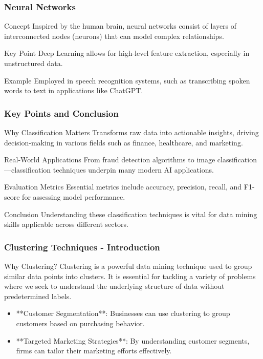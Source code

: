\documentclass[aspectratio=169]{beamer}
\begin{document}
\begin{frame}[fragile]
    \frametitle{Neural Networks}
    \begin{block}{Concept}
        Inspired by the human brain, neural networks consist of layers of interconnected nodes (neurons) that can model complex relationships.
    \end{block}
    \begin{block}{Key Point}
        Deep Learning allows for high-level feature extraction, especially in unstructured data.
    \end{block}
    \begin{block}{Example}
        Employed in speech recognition systems, such as transcribing spoken words to text in applications like ChatGPT.
    \end{block}
\end{frame}

\begin{frame}[fragile]
    \frametitle{Key Points and Conclusion}
    \begin{block}{Why Classification Matters}
        Transforms raw data into actionable insights, driving decision-making in various fields such as finance, healthcare, and marketing.
    \end{block}
    \begin{block}{Real-World Applications}
        From fraud detection algorithms to image classification—classification techniques underpin many modern AI applications.
    \end{block}
    \begin{block}{Evaluation Metrics}
        Essential metrics include accuracy, precision, recall, and F1-score for assessing model performance.
    \end{block}
    \begin{block}{Conclusion}
        Understanding these classification techniques is vital for data mining skills applicable across different sectors.
    \end{block}
\end{frame}

\begin{frame}[fragile]
    \frametitle{Clustering Techniques - Introduction}
    \begin{block}{Why Clustering?}
        Clustering is a powerful data mining technique used to group similar data points into clusters. It is essential for tackling a variety of problems where we seek to understand the underlying structure of data without predetermined labels.
    \end{block}
    \begin{itemize}
        \item **Customer Segmentation**: Businesses can use clustering to group customers based on purchasing behavior.
        \item **Targeted Marketing Strategies**: By understanding customer segments, firms can tailor their marketing efforts effectively.
    \end{itemize}
\end{frame}
\end{document}

